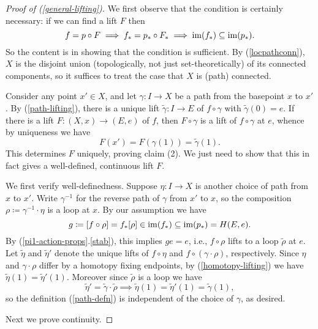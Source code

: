 \begin{proof}[Proof of (\ref{general-lifting})]
  We first observe that the condition is certainly necessary: if we
  can find a lift $F$ then
  \[
  f = p \circ F \implies f_* = p_* \circ F_* \implies \operatorname{im}(f_*)
  \subseteq \operatorname{im}(p_*).
  \]
  So the content is in showing that the condition is sufficient. By
  (\ref{locpathconn}), $X$ is the disjoint union (topologically, not
  just set-theoretically) of its connected components, so it suffices
  to treat the case that $X$ is (path) connected.

  Consider any point $x' \in X$, and let $\gamma : I \to X$ be a path
  from the basepoint $x$ to $x'$. By (\ref{path-lifting}), there is a
  unique lift $\tilde\gamma : I \to E$ of $f \circ \gamma$ with
  $\tilde\gamma(0) = e$. If there is a lift $F : (X,x) \to (E,e)$ of
  $f$, then $F \circ \gamma$ is a lift of $f \circ \gamma$ at $e$,
  whence by uniqueness we have
  \begin{equation}
    \label{path-defn}
    F(x') = F(\gamma(1)) = \tilde\gamma(1).
  \end{equation}
  This determines $F$ uniquely, proving claim (2). We just need to
  show that this in fact gives a well-defined, continuous lift $F$.

  We first verify well-definedness. Suppose $\eta : I \to X$ is
  another choice of path from $x$ to $x'$. Write $\gamma^{-1}$ for the
  reverse path of $\gamma$ from $x'$ to $x$, so the composition $\rho
  \coloneqq \gamma^{-1} \cdot \eta$ is a loop at $x$. By our
  assumption we have
  \[
  g \coloneqq [f \circ \rho] = f_*[\rho] \in \operatorname{im}(f_*) \subseteq
  \operatorname{im}(p_*) = H(E,e).
  \]
  By (\ref{pi1-action-props}.\ref{stab}), this implies $ge = e$, i.e.,
  $f \circ \rho$ lifts to a loop $\tilde\rho$ at $e$. Let $\tilde\eta$
  and $\tilde\eta'$ denote the unique lifts of $f \circ \eta$ and $f
  \circ (\gamma \cdot \rho)$, respectively. Since $\eta$ and $\gamma
  \cdot \rho$ differ by a homotopy fixing endpoints, by
  (\ref{homotopy-lifting}) we have $\tilde\eta(1) =
  \tilde\eta'(1)$. Moreover since $\tilde\rho$ is a loop we have
  \[
  \tilde\eta' = \tilde\gamma \cdot \tilde\rho \implies \tilde\eta(1)=
  \tilde\eta'(1) = \tilde\gamma(1),
  \]
  so the definition (\ref{path-defn}) is independent of the choice of
  $\gamma$, as desired.

  Next we prove continuity.
\end{proof}


